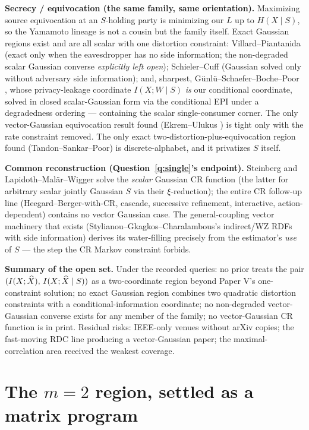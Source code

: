 \documentclass[11pt]{article}
\begin{document}
\textbf{Secrecy / equivocation (the same family, same orientation).}
Maximizing source equivocation at an $S$-holding party is minimizing our
$L$ up to $H(X\mid S)$, so the Yamamoto lineage \cite{yamamoto1983} is not
a cousin but the family itself. Exact Gaussian regions exist and are all
scalar with one distortion constraint: Villard--Piantanida
\cite{villard2013} (exact only when the eavesdropper has no side
information; the non-degraded scalar Gaussian converse \emph{explicitly
left open}); Schieler--Cuff (Gaussian solved only without adversary side
information); and, sharpest, G\"unl\"u--Schaefer--Boche--Poor
\cite{gunlu2023}, whose privacy-leakage coordinate $I(X;W\mid S)$ \emph{is}
our conditional coordinate, solved in closed scalar-Gaussian form via the
conditional EPI under a degradedness ordering --- containing the scalar
single-consumer corner. The only vector-Gaussian equivocation result found
(Ekrem--Ulukus \cite{ekrem2013}) is tight only with the rate constraint
removed. The only exact two-distortion-plus-equivocation region found
(Tandon--Sankar--Poor) is discrete-alphabet, and it privatizes $S$ itself.

\textbf{Common reconstruction (Question~\ref{q:single}'s endpoint).}
Steinberg \cite{steinberg2009} and Lapidoth--Mal\"ar--Wigger
\cite{lmw2014} solve the \emph{scalar} Gaussian CR function (the latter
for arbitrary scalar jointly Gaussian $S$ via their $\xi$-reduction); the
entire CR follow-up line (Heegard--Berger-with-CR, cascade, successive
refinement, interactive, action-dependent) contains no vector Gaussian
case. The general-coupling vector machinery that exists
(Stylianou--Gkagkos--Charalambous's indirect/WZ RDFs with side information)
derives its water-filling precisely from the estimator's \emph{use} of $S$
--- the step the CR Markov constraint forbids.

\textbf{Summary of the open set.} Under the recorded queries: no prior
treats the pair $(I(X;\widehat X),\,I(X;\widehat X\mid S))$ as a two-coordinate region
beyond Paper V's one-constraint solution; no exact Gaussian region combines
two quadratic distortion constraints with a conditional-information
coordinate; no non-degraded vector-Gaussian converse exists for any member
of the family; no vector-Gaussian CR function is in print. Residual risks:
IEEE-only venues without arXiv copies; the fast-moving RDC line
\cite{wang2024rdc} producing a vector-Gaussian paper; the
maximal-correlation area received the weakest coverage.

\section{The $m=2$ region, settled as a matrix program}\label{sec:m2}
\end{document}
